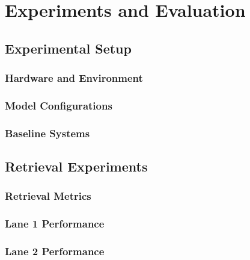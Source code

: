 \chapter{Experiments and Evaluation}
\label{ch:experiments}

%
%
\section{Experimental Setup}
\label{sec:experiments:setup}

\subsection{Hardware and Environment}
\label{subsec:experiments:setup:hardware}

\subsection{Model Configurations}
\label{subsec:experiments:setup:models}

\subsection{Baseline Systems}
\label{subsec:experiments:setup:baselines}

%
%
\section{Retrieval Experiments}
\label{sec:experiments:retrieval}

\subsection{Retrieval Metrics}
\label{subsec:experiments:retrieval:metrics}

\subsection{Lane 1 Performance}
\label{subsec:experiments:retrieval:lane1}

\subsection{Lane 2 Performance}
\label{subsec:experiments:retrieval:lane2}


